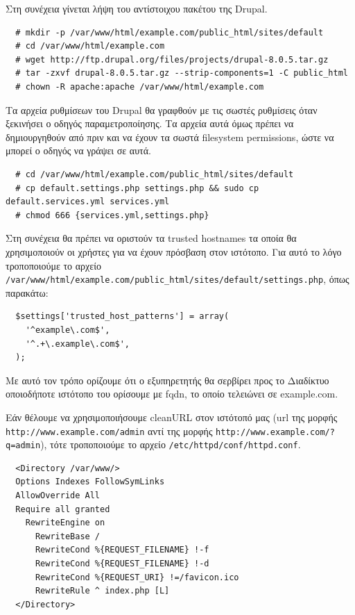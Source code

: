 \documentclass[12pt]{report}
\begin{document}
Στη συνέχεια γίνεται λήψη του αντίστοιχου πακέτου της \textlatin{Drupal}.
\scriptsize
\begin{verbatim}
  # mkdir -p /var/www/html/example.com/public_html/sites/default
  # cd /var/www/html/example.com
  # wget http://ftp.drupal.org/files/projects/drupal-8.0.5.tar.gz
  # tar -zxvf drupal-8.0.5.tar.gz --strip-components=1 -C public_html
  # chown -R apache:apache /var/www/html/example.com
\end{verbatim}
\normalsize
{}

Τα αρχεία ρυθμίσεων του \textlatin{Drupal} θα γραφθούν με τις σωστές ρυθμίσεις όταν ξεκινήσει ο οδηγός παραμετροποίησης. Τα αρχεία αυτά όμως πρέπει να δημιουργηθούν από πριν και να έχουν τα σωστά \textlatin{filesystem permissions}, ώστε να μπορεί ο οδηγός να γράψει σε αυτά.
\scriptsize
\begin{verbatim}
  # cd /var/www/html/example.com/public_html/sites/default
  # cp default.settings.php settings.php && sudo cp default.services.yml services.yml
  # chmod 666 {services.yml,settings.php}
\end{verbatim}
\normalsize
{}

Στη συνέχεια θα πρέπει να οριστούν τα \textlatin{trusted hostnames} τα οποία θα χρησιμοποιούν οι χρήστες για να έχουν πρόσβαση στον ιστότοπο. Για αυτό το λόγο τροποποιούμε το αρχείο \textlatin{\texttt{/var/www/html/example.com/public\_html/sites/default/settings.php}}, όπως παρακάτω:
\scriptsize
\begin{verbatim}
  $settings['trusted_host_patterns'] = array(
    '^example\.com$',
    '^.+\.example\.com$',
  );
\end{verbatim}
\normalsize
{}

Με αυτό τον τρόπο ορίζουμε ότι ο εξυπηρετητής θα σερβίρει προς το Διαδίκτυο οποιοδήποτε ιστότοπο του ορίσουμε με \textlatin{fqdn}, το οποίο τελειώνει σε \textlatin{example.com}.

Εάν θέλουμε να χρησιμοποιήσουμε \textlatin{cleanURL} στον ιστότοπό μας (\textlatin{url} της μορφής \textlatin{\texttt{http://www.example.com/admin}} αντί της μορφής \textlatin{\texttt{http://www.example.com/?q=admin}}), τότε τροποποιούμε το αρχείο \textlatin{\texttt{/etc/httpd/conf/httpd.conf}}.
\scriptsize
\begin{verbatim}
  <Directory /var/www/>
  Options Indexes FollowSymLinks
  AllowOverride All
  Require all granted
    RewriteEngine on
      RewriteBase /
      RewriteCond %{REQUEST_FILENAME} !-f
      RewriteCond %{REQUEST_FILENAME} !-d
      RewriteCond %{REQUEST_URI} !=/favicon.ico
      RewriteRule ^ index.php [L]
  </Directory>
\end{verbatim}
\normalsize
{}
\end{document}
